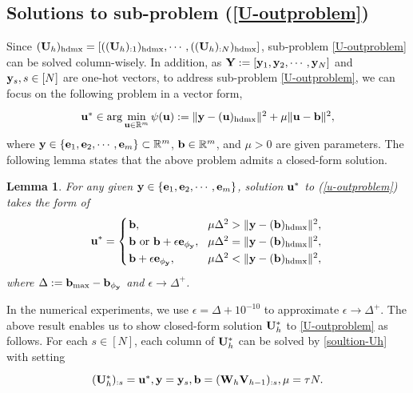 \documentclass[journal]{IEEEtran}
\newtheorem{lemma}{Lemma}
\newcommand{\ba}{\begin{array}}
\newcommand{\ea}{\end{array}}
\newcommand{\be}{\begin{equation}}
\newcommand{\ee}{\end{equation}}
\def\R{\mathbb{R}}
\def\U{{\bf U}}
\def\V{{\bf V}}
\def\W{{\bf W}}
\def\Y{{\bf Y}}
\def\b{{\bf b}}
\def\e{{\bf e}}
\def\hd{{\rm hdmx}}
\def\u{{\bf u}}
\def\y{{\bf y}}
\begin{document}
\subsection{Solutions to sub-problem (\ref{U-outproblem})}
Since  $(\U_h)_{\hd} =[((\U_h)_{:1})_\hd, \cdots , ((\U_h)_{:N})_\hd]$, sub-problem \eqref{U-outproblem} can be solved column-wisely. In addition, as $\Y:=[\y_1,\y_2,\cdots,\y_N]$ and $\y_s,s\in[N]$ are one-hot vectors, to address sub-problem \eqref{U-outproblem},  we can focus on the following problem in a vector form,
\begin{eqnarray}\label{u-outproblem}
 \arraycolsep=1.0pt\def\arraystretch{1.25}
\begin{array}{l}
\u^* \in {\rm arg}\min\limits_{\u\in\R^m} \psi(\u):=\|\y- (\u)_\hd\|^{2}+ \mu \|\u-\b\|^2,
\end{array} \end{eqnarray}
where $\y\in\{\e_1,\e_2,\cdots,\e_m\}\subset\R^m $, $\b\in\R^m$,  and $\mu>0$ are given parameters.  The following lemma states that the above problem admits a closed-form solution.
\begin{lemma}\label{u-outlemma} For any given $\y\in\{\e_1,\e_2,\cdots,\e_m\}$,  solution $\u^*$ to (\ref{u-outproblem}) takes the form of
\begin{eqnarray}\label{soultion-Uh}
 \arraycolsep=1.0pt\def\arraystretch{1.25}
\u^*=  \left\{\begin{array}{lll}
\b, & \mu \Delta^2 > \|\y-(\b)_\hd \|^2,\\
\b~ \text{or}~\b+\epsilon \e_{\phi_\y}, ~~& \mu \Delta^2  = \|\y-(\b)_\hd \|^2,\\
 \b+\epsilon \e_{\phi_\y}, & \mu \Delta^2  < \|\y-(\b)_\hd \|^2,
\end{array}\right.
\end{eqnarray}
where  $\Delta:=\b_{\max}-\b_{\phi_\y}$ and $ \epsilon\to\Delta^+$.
\end{lemma}
 In the numerical experiments, we use $\epsilon=\Delta+10^{-10}$ to approximate $\epsilon\to\Delta^+$. The above result enables us  to show closed-form solution $ \U^*_{h}$ to \eqref{U-outproblem} as follows. For each $s\in[N]$, each column of $ \U^*_{h}$ can be solved by \eqref{soultion-Uh} with setting
\be\ba{l}\label{Uh-problem-*}
(\U^*_{h})_{:s}=\u^*, \y = \y_s,  \b=(\W_h\V_{h-1})_{:s},\mu=\tau N.
\ea\ee
\end{document}
